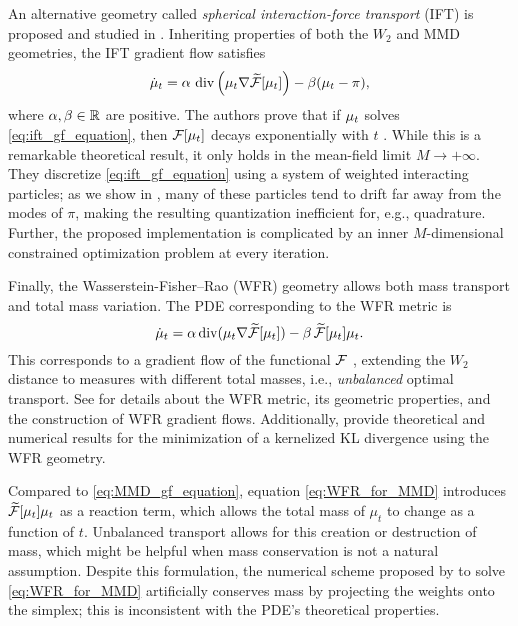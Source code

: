 An alternative geometry called \emph{spherical interaction-force transport} (IFT) is proposed and studied in \cite{GlDvMiZh24,ZhMi24}. Inheriting properties of both the $W_2$ and MMD geometries, the IFT gradient flow satisfies
\begin{equation}\label{eq:ift_gf_equation}
     \dot{\mu}_t = \alpha\ \mathrm{div} \left( \mu_{t} \nabla \widetilde{\mathcal{F}} [\mu_{t}] \right) - \beta(\mu_{t} - \pi),
\end{equation}
where $\alpha, \beta\in\mathbb{R}$ are positive. The authors prove that if $\mu_{t}$ solves \eqref{eq:ift_gf_equation}, then $\mathcal{F}[\mu_{t}]$ decays exponentially with $t$ \citep[Theorem 3.5]{GlDvMiZh24}.  While this is a remarkable theoretical result, it only holds in the mean-field limit $M \rightarrow +\infty$. They discretize  \eqref{eq:ift_gf_equation} using a system of weighted interacting particles; as we show in , many of these particles tend to drift far away from the modes of $\pi$, making the resulting quantization inefficient for, e.g., quadrature. %
Further, the proposed implementation is complicated by an inner $M$-dimensional constrained optimization problem at every iteration.













Finally, the Wasserstein-Fisher–Rao (WFR) geometry %
allows both mass transport and total mass variation. The PDE corresponding to the WFR metric is
\begin{equation}\label{eq:WFR_for_MMD}
    \dot{\mu}_t = \alpha\,\mathrm{div}(\mu_{t} \nabla \widetilde{\mathcal{F}}[\mu_{t}]) - \beta\,\widetilde{\mathcal{F}}[\mu_{t}] \mu_{t}.
\end{equation}
This corresponds to a gradient flow of the functional $\mathcal{F}$%
, extending the $W_2$ distance to measures with different total masses, i.e., \emph{unbalanced} optimal transport. See \cite{KoMoVo16,GaMo17,ChPeScVi18,LiMiSa18} for details about the WFR metric, its geometric properties, and the construction of WFR gradient flows. %
Additionally, \citep{LuLuNo19,LuSlWa23,YaWaRi24} provide theoretical and numerical results for the minimization of a kernelized KL divergence using the WFR geometry.

Compared to \eqref{eq:MMD_gf_equation}, equation \eqref{eq:WFR_for_MMD} introduces $\widetilde{\mathcal{F}}[\mu_t]\mu_t$ as a reaction term, which allows the total mass of $\mu_t$ to change as a function of $t$. %
Unbalanced transport allows for this creation or destruction of mass, which might be helpful when mass conservation is not a natural assumption. Despite this formulation, the numerical scheme proposed by \cite{GlDvMiZh24} to solve \eqref{eq:WFR_for_MMD} artificially conserves mass by projecting the weights onto the simplex; this is inconsistent with the PDE's theoretical properties.%
